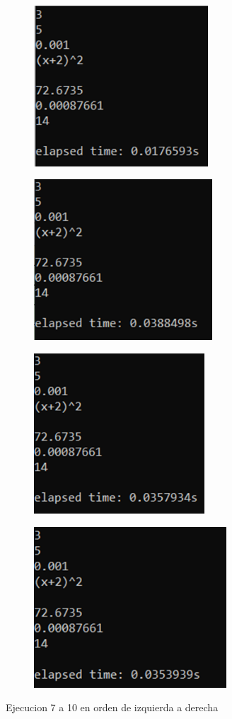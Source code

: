 \documentclass[12pt, letterpaper]{article}
\begin{document}
\begin{flushleft}
\begin{figure}[H]
\begin{subfigure}{0.49\textwidth}
            \includegraphics[width=1\linewidth, height=6cm]{Imagen7} 
        \end{subfigure}
        \begin{subfigure}{0.49\textwidth}
            \includegraphics[width=1\linewidth, height=6cm]{Imagen8}
        \end{subfigure}
        \begin{subfigure}{0.49\textwidth}
            \includegraphics[width=1\linewidth, height=6cm]{Imagen9}
        \end{subfigure}
        \begin{subfigure}{0.49\textwidth}
            \includegraphics[width=1\linewidth, height=6cm]{Imagen10}
        \end{subfigure}
        \caption{Ejecucion 7 a 10 en orden de izquierda a derecha}
    \end{figure}
    

\end{flushleft}
\end{document}
